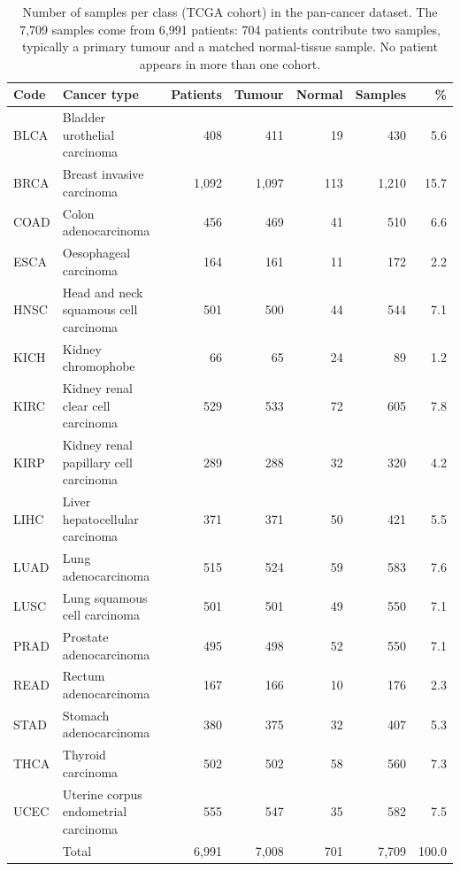 \begin{table}[htbp]
  \centering
  \caption{Number of samples per class (TCGA cohort) in the pan-cancer dataset. The 7{,}709
    samples come from 6{,}991 patients: 704 patients contribute two samples, typically a primary
    tumour and a matched normal-tissue sample. No patient appears in more than one cohort.}
  \label{tab:class-distribution}
  \begin{tabular}{llrrrrr}
    \toprule
    Code & Cancer type & Patients & Tumour & Normal & Samples & \% \\
    \midrule
    BLCA & Bladder urothelial carcinoma          &   408 &   411 &  19 &   430 &  5.6 \\
    BRCA & Breast invasive carcinoma             & 1{,}092 & 1{,}097 & 113 & 1{,}210 & 15.7 \\
    COAD & Colon adenocarcinoma                  &   456 &   469 &  41 &   510 &  6.6 \\
    ESCA & Oesophageal carcinoma                 &   164 &   161 &  11 &   172 &  2.2 \\
    HNSC & Head and neck squamous cell carcinoma &   501 &   500 &  44 &   544 &  7.1 \\
    KICH & Kidney chromophobe                    &    66 &    65 &  24 &    89 &  1.2 \\
    KIRC & Kidney renal clear cell carcinoma     &   529 &   533 &  72 &   605 &  7.8 \\
    KIRP & Kidney renal papillary cell carcinoma &   289 &   288 &  32 &   320 &  4.2 \\
    LIHC & Liver hepatocellular carcinoma        &   371 &   371 &  50 &   421 &  5.5 \\
    LUAD & Lung adenocarcinoma                   &   515 &   524 &  59 &   583 &  7.6 \\
    LUSC & Lung squamous cell carcinoma          &   501 &   501 &  49 &   550 &  7.1 \\
    PRAD & Prostate adenocarcinoma               &   495 &   498 &  52 &   550 &  7.1 \\
    READ & Rectum adenocarcinoma                 &   167 &   166 &  10 &   176 &  2.3 \\
    STAD & Stomach adenocarcinoma                &   380 &   375 &  32 &   407 &  5.3 \\
    THCA & Thyroid carcinoma                     &   502 &   502 &  58 &   560 &  7.3 \\
    UCEC & Uterine corpus endometrial carcinoma  &   555 &   547 &  35 &   582 &  7.5 \\
    \midrule
         & Total                                 & 6{,}991 & 7{,}008 & 701 & 7{,}709 & 100.0 \\
    \bottomrule
  \end{tabular}
\end{table}
